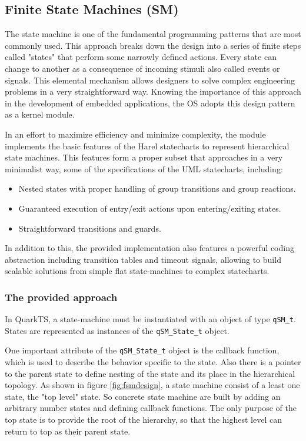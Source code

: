 \subsection{Finite State Machines (SM)}
The state machine is one of the fundamental programming patterns that are most commonly used. This approach breaks down the design into a series of finite steps called "states" that perform some narrowly defined actions. Every state can change to another as a consequence of incoming stimuli also called events or signals. This elemental mechanism allows designers to solve complex engineering problems in a very straightforward way.
Knowing the importance of this approach in the development of embedded applications, the OS adopts this design pattern as a kernel module.

In an effort to maximize efficiency and minimize complexity, the module implements the basic features of the Harel statecharts to represent hierarchical state machines. This features form a proper subset that approaches in a very minimalist way, some of the specifications of the UML statecharts, including:

\begin{itemize}
    \item Nested states with proper handling of group transitions and group reactions.
    \item Guaranteed execution of entry/exit actions upon entering/exiting states.
    \item Straightforward transitions and guards.
\end{itemize} 

In addition to this, the provided implementation also features a powerful coding abstraction including transition tables and timeout signals, allowing to build scalable solutions from simple flat state-machines to complex statecharts. 

\subsubsection{The provided approach}

In QuarkTS, a state-machine must be instantiated with an object of type \lstinline{qSM_t}. States are represented as instances of the \lstinline{qSM_State_t} object. 



One important attribute of the \lstinline{qSM_State_t} object is the callback function, which is used to describe the behavior specific to the state. Also there is a pointer to the parent state to define nesting of the state and its place in the hierarchical topology.
As shown in figure \ref{fig:fsmdesign}, a state machine consist of a least one state, the "top level" state.
So concrete state machine are built by adding an arbitrary number states and defining callback functions. The only purpose of the top state is to provide the root of the hierarchy, so that the highest level can return to top as their parent state. 


